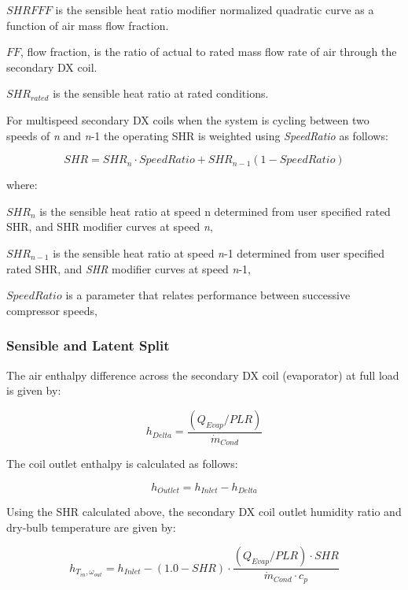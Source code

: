 \(SHRFFF\) is the sensible heat ratio modifier normalized quadratic curve as a function of air mass flow fraction. 

\(FF\), flow fraction,  is the ratio of actual to rated mass flow rate of air through the secondary DX coil.

\(SHR_{rated}\) is the sensible heat ratio at rated conditions.

For multispeed secondary DX coils when the system is cycling between two speeds of \emph{n} and \emph{n}-1 the operating SHR is weighted using \emph{SpeedRatio} as follows:

\begin{equation}
SHR = SHR_n \cdot SpeedRatio +  SHR_{n-1} (1 - SpeedRatio)
\end{equation}

where:

\(SHR_n\) is the sensible heat ratio at speed n determined from user specified rated SHR, and SHR modifier curves at speed \emph{n},

\(SHR_{n-1}\) is the sensible heat ratio at speed \emph{n}-1 determined from user specified rated SHR, and \emph{SHR} modifier curves at speed \emph{n}-1,

\(SpeedRatio\) is a parameter that relates performance between successive compressor speeds,

\subsubsection{Sensible and Latent Split}\label{sensible-and-latent-split}

The air enthalpy difference across the secondary DX coil (evaporator) at full load is given by:

\begin{equation}
  h_{Delta} = \frac{\left(Q_{Evap}/PLR\right)}{\dot{m}_{Cond}}
\end{equation}

The coil outlet enthalpy is calculated as follows:

\begin{equation}
  h_{Outlet} = h_{Inlet}-h_{Delta}
\end{equation}

Using the SHR calculated above, the secondary DX coil outlet humidity ratio and dry-bulb temperature are given by:

\begin{equation}
  h_{T_{in},\omega_{out}} = h_{Inlet} - \left(1.0 - SHR\right) \cdot \frac{\left(Q_{Evap}/PLR\right)\cdot SHR}{\dot{m}_{Cond}\cdot c_p}
\end{equation}

